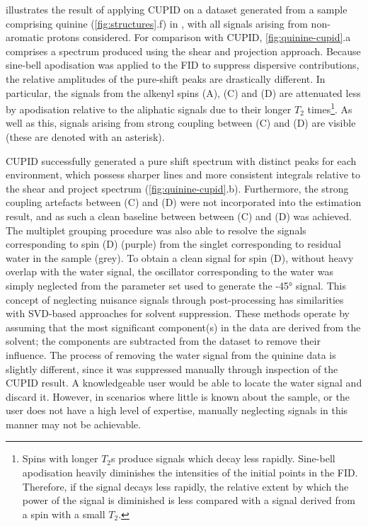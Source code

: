  illustrates the result of applying \ac{CUPID} on
a dataset generated from a sample comprising quinine (\cref{fig:structures}.f)
in ,
with all signals arising from non-aromatic protons considered.
For comparison with \ac{CUPID}, \cref{fig:quinine-cupid}.a comprises a
spectrum produced using the shear and projection approach. Because
sine-bell apodisation was applied to the \ac{FID} to suppress dispersive
contributions, the relative amplitudes of the pure-shift
peaks are drastically different.  In particular, the signals from the alkenyl
spins (A), (C) and (D) are attenuated less by apodisation relative to the
aliphatic signals due to their longer $T_2$ times\footnote{
    Spins with longer $T_2$s produce signals which decay less rapidly.
    Sine-bell apodisation heavily diminishes the intensities of the initial
    points in the \ac{FID}. Therefore, if the signal decays less rapidly, the
    relative extent by which the power of the signal is diminished is less
    compared with a signal derived from a spin with a small $T_2$.
}. As well as this, signals arising from strong coupling between (C) and
(D) are visible (these are denoted with an asterisk).

\ac{CUPID} successfully generated a pure shift spectrum with distinct peaks for
each  environment, which possess sharper lines and more consistent
integrals relative to the shear and project spectrum (\cref{fig:quinine-cupid}.b).
Furthermore, the strong coupling artefacts between (C) and (D) were not
incorporated into the estimation result, and as such a clean baseline between
between (C) and (D) was achieved.
The multiplet grouping procedure was also able to resolve
the signals corresponding to spin (D) (purple) from the singlet corresponding
to residual water in the sample (grey).
To obtain a clean signal for spin (D), without heavy overlap with the water
signal, the oscillator corresponding to the water was simply neglected from
the parameter set used to generate the \ang{-45} signal. This concept of
neglecting nuisance signals through post-processing has similarities with
\ac{SVD}-based approaches for solvent suppression\cite{Zhu1997}.
These methods operate by assuming that the most significant component(s) in the
data are derived from the solvent; the components are subtracted from the dataset to
remove their influence. The process of removing the water signal from the quinine
data is slightly different, since it was suppressed manually through
inspection of the \ac{CUPID} result. A knowledgeable user would be able to
locate the water signal and discard it. However, in scenarios where little is
known about the sample, or the user does not have a high level of expertise,
manually neglecting signals in this manner may not be achievable.

